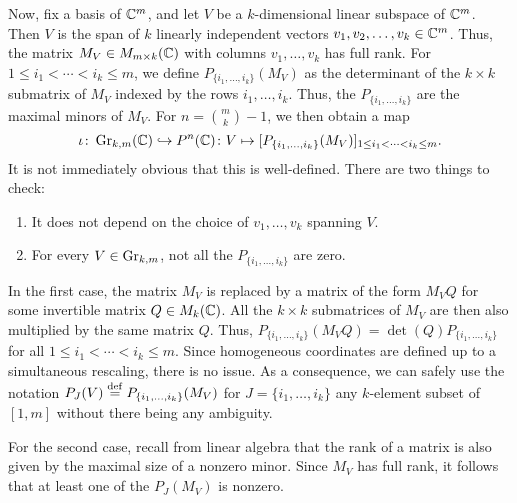 Now, fix a basis of $\mathbb{C}^m$, and let $V$ be a $k$-dimensional linear subspace of
$\mathbb{C}^m$. Then $V$ is the span of $k$ linearly independent vectors $v_1, v_2, \dots,
	v_k \in \mathbb{C}^m$. Thus, the matrix $M_V \in M_{m \times k}(\mathbb{C})$ with columns $v_1,
	\dots, v_k$ has full rank. For $1 \leq i_1 < \dotsb < i_k \leq m$, we define $P_{\{i_1,
			\dots, i_k\}}(M_V)$ as the determinant of the $k \times k$ submatrix of $M_V$ indexed
by the rows $i_1, \dots, i_k$. Thus, the $P_{\{i_1, \dots, i_k\}}$ are the maximal
minors of $M_V$. For $n = \binom{m}{k} - 1$, we then obtain a map
\begin{equation*}
	\iota \colon \operatorname{Gr}_{k, m}(\mathbb{C}) \hookrightarrow P^n(\mathbb{C}) \colon V \mapsto [P_{\{i_1, \dotsc, i_k\}}(M_V)]_{1 \leq i_1 < \cdots < i_k \leq m}.
\end{equation*}
%
It is not immediately obvious that this is well-defined. There are two things to check:
\begin{enumerate}
	\item It does not depend on the choice of $v_1, \dots, v_k$ spanning $V$.
	\item For every $V \in \operatorname{Gr}_{k, m}$, not all the $P_{\{i_1, \dots, i_k\}}$ are zero.
\end{enumerate}

In the first case, the matrix $M_V$ is replaced by a matrix of the form $M_V Q$ for
some invertible matrix $Q \in M_k(\mathbb{C})$. All the $k \times k$ submatrices of $M_V$ are
then also multiplied by the same matrix $Q$. Thus, $P_{\{i_1, \dots, i_k\}}(M_V Q) =
	\det(Q) P_{\{i_1, \dots, i_k\}}$ for all $1 \leq i_1 < \dotsb < i_k \leq m$. Since
homogeneous coordinates are defined up to a simultaneous rescaling, there is no issue.
As a consequence, we can safely use the notation $P_J (V) \overset{\mathrm{def}}{=} P_{\{i_1, \dotsc,
			i_k\}} (M_V)$ for $J = \{i_1, \dotsc, i_k\}$ any $k$-element subset of $[1, m]$ without
there being any ambiguity.

For the second case, recall from linear algebra that the rank of a matrix is also given
by the maximal size of a nonzero minor. Since $M_V$ has full rank, it follows that at
least one of the $P_J(M_V)$ is nonzero.

